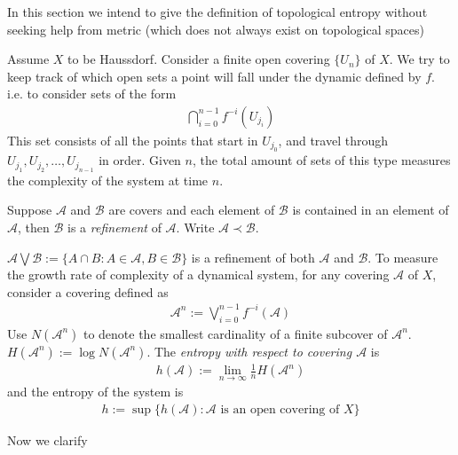 \documentclass{article}
\begin{document}
In this section we intend to give the definition of topological entropy without seeking help from metric (which does not always exist on topological spaces)

Assume $X$ to be Haussdorf. Consider a finite open covering $\{U_n\}$ of $X$. We try to keep track of which open sets a point will fall under the dynamic defined by $f$. i.e. to consider sets of the form
\begin{align*}
	\bigcap_{i=0}^{n-1}f^{-i}(U_{j_i})
\end{align*}
This set consists of all the points that start in $U_{j_0}$, and travel through $U_{j_1},U_{j_2},\dots,U_{j_{n-1}}$ in order. Given $n$, the total amount of sets of this type measures the complexity of the system at time $n$.


Suppose $\mathcal{A}$ and $\mathcal{B}$ are covers and each element of $\mathcal{B}$ is contained in an element of $\mathcal{A}$, then $\mathcal{B}$ is a \emph{refinement} of $\mathcal{A}$. Write $\mathcal{A}\prec \mathcal{B}$.

$\mathcal{A} \bigvee \mathcal{B}:=\{A\cap B:A\in \mathcal{A},B\in\mathcal{B}\}$ is a refinement of both $\mathcal{A}$ and $\mathcal{B}$. To measure the growth rate of complexity of a dynamical system, for any covering $\mathcal{A}$ of $X$, consider a covering defined as 
\begin{align*}
\mathcal{A}^{n}:=\bigvee_{i=0}^{n-1}f^{-i}(\mathcal{A})	
\end{align*}
Use $N(\mathcal{A}^n)$ to denote the smallest cardinality of a finite subcover of $\mathcal{A}^n$. $H(\mathcal{A}^n):=\log N(\mathcal{A}^n)$. The\emph{ entropy with respect to covering $\mathcal{A}$} is 
\begin{align*}
	h(\mathcal{A}):=\lim_{n\rightarrow\infty}\frac{1}{n}H(\mathcal{A}^n)
\end{align*}
and the entropy of the system is 
\begin{align*}
	h:=\sup\{h(\mathcal{A}):\mathcal{A}\mbox{ is an open covering of $X$}\}
\end{align*}


Now we clarify 
\end{document}
